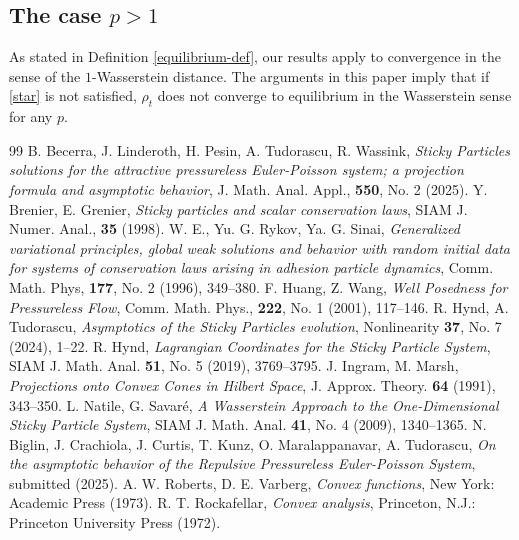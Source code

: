 \documentclass[10pt,a4paper]{amsart}
\numberwithin{equation}{section}
\begin{document}
\subsection{The case $p>1$}\label{p>1}
    As stated in Definition \ref{equilibrium-def}, our results apply to convergence in the sense of the $1$-Wasserstein distance. The arguments in this paper imply that if \eqref{star} is not satisfied, $\rho_t$ does not converge to equilibrium in the Wasserstein sense for any $p$. 


\begin{thebibliography}{99}
 {\sc B. Becerra, J. Linderoth, H. Pesin, A. Tudorascu, R. Wassink}, {\em Sticky Particles solutions for the attractive pressureless Euler-Poisson system; a projection formula and asymptotic behavior}, J. Math. Anal. Appl., \textbf{550}, No. 2 (2025).
 {\sc Y. Brenier, E. Grenier}, {\em Sticky particles and scalar conservation laws}, SIAM J. Numer. Anal., \textbf{35} (1998).
 {\sc W. E., Yu. G. Rykov, Ya. G. Sinai}, {\em Generalized variational principles, global weak solutions and behavior with random initial data for systems of conservation laws arising in adhesion particle dynamics}, Comm. Math. Phys, \textbf{177}, No. 2 (1996), 349--380.
 {\sc F. Huang, Z. Wang}, {\em Well Posedness for Pressureless Flow}, Comm. Math. Phys., \textbf{222}, No. 1 (2001), 117--146.
 {\sc R. Hynd, A. Tudorascu}, \emph{Asymptotics of the Sticky Particles evolution}, Nonlinearity \textbf{37}, No. 7 (2024), 1--22.
 {\sc R. Hynd}, \emph{Lagrangian Coordinates for the Sticky Particle System}, SIAM J. Math. Anal. \textbf{51}, No. 5 (2019), 3769--3795. %
 {\sc J. Ingram, M. Marsh}, \emph{Projections onto Convex Cones in Hilbert Space}, J. Approx. Theory. \textbf{64} (1991), 343--350.
 {\sc L. Natile, G. Savar\'{e}}, \emph{A Wasserstein Approach to the One-Dimensional Sticky Particle System}, SIAM J. Math. Anal. \textbf{41}, No. 4 (2009), 1340--1365.
 {\sc N. Biglin, J. Crachiola, J. Curtis, T. Kunz, O. Maralappanavar, A. Tudorascu}, {\em On the asymptotic behavior of the Repulsive Pressureless Euler-Poisson System}, submitted (2025). %
 {\sc A. W. Roberts, D. E. Varberg}, \emph{Convex functions}, New York: Academic Press (1973).
 {\sc R. T. Rockafellar}, \emph{Convex analysis}, Princeton, N.J.: Princeton University Press (1972).

\end{thebibliography}
\end{document}
